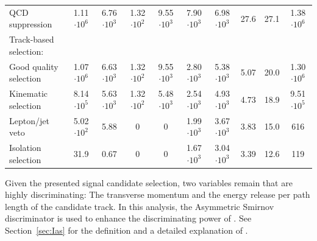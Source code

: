 \begin{table}
{\begin{tabular}{|l|c|c|c|c|c|c|c|c|c|}
QCD suppression                                                                           & 1.11 $\cdot10^{6 }$ & 6.76 $\cdot10^{3 }$ & 1.32 $\cdot10^{2 }$ & 9.55 $\cdot10^{3 }$ & 7.90 $\cdot10^{3 }$ & 6.98 $\cdot10^{3 }$ & 27.6 & 27.1 & 1.38 $\cdot10^{6 }$ \\
Track-based selection:                                                                    
& & & & & & & & & \\
Good quality selection                                                                    & 1.07 $\cdot10^{6 }$ & 6.63 $\cdot10^{3 }$ & 1.32 $\cdot10^{2 }$ & 9.55 $\cdot10^{3 }$ & 2.80 $\cdot10^{3 }$ & 5.38 $\cdot10^{3 }$ & 5.07  & 20.0 & 1.30 $\cdot10^{6 }$ \\
Kinematic selection                                                                       & 8.14 $\cdot10^{5 }$ & 5.63 $\cdot10^{3 }$ & 1.32 $\cdot10^{2 }$ & 5.48 $\cdot10^{3 }$ & 2.54 $\cdot10^{3 }$ & 4.93 $\cdot10^{3 }$ & 4.73  & 18.9 & 9.51 $\cdot10^{5 }$ \\
Lepton/jet veto                                                                           & 5.02 $\cdot10^{2 }$ & 5.88  & 0  & 0  & 1.99 $\cdot10^{3 }$ & 3.67 $\cdot10^{3 }$ & 3.83  & 15.0  & 616 \\
Isolation selection                                                                       & 31.9  & 0.67  & 0  & 0  & 1.67 $\cdot10^{3 }$ & 3.04 $\cdot10^{3 }$ & 3.39  & 12.6  & 119  \\
\bottomrule
\end{tabular}}
\end{table}

Given the presented signal candidate selection, two variables remain that are highly discriminating:
The transverse momentum \pt and the energy release per path length \dedx of the candidate track.
In this analysis, the Asymmetric Smirnov discriminator \ias is used to enhance the discriminating power of \dedx.
See Section~\ref{sec:Ias} for the definition and a detailed explanation of \ias.

